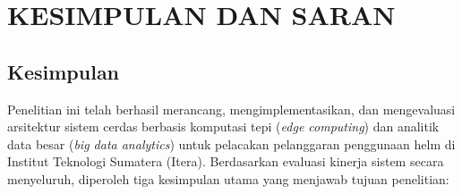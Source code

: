\chapter{KESIMPULAN DAN SARAN}
\label{chap:kesimpulan}

\section{Kesimpulan}
\label{sec:kesimpulan}

Penelitian ini telah berhasil merancang, mengimplementasikan, dan mengevaluasi arsitektur sistem cerdas berbasis komputasi tepi (\textit{edge computing}) dan analitik data besar (\textit{big data analytics}) untuk pelacakan pelanggaran penggunaan helm di Institut Teknologi Sumatera (Itera). Berdasarkan evaluasi kinerja sistem secara menyeluruh, diperoleh tiga kesimpulan utama yang menjawab tujuan penelitian:

